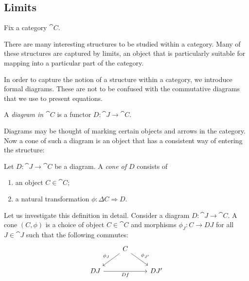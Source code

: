 \documentclass{article}
\begin{document}
\subsection{Limits}

Fix a category $\cat{C}$.

There are many interesting structures to be studied within a category. Many of these
structures are captured by limits, an object that is particularly suitable
for mapping into a particular part of the category.

In order to capture the notion of a structure within a category, we introduce
formal diagrams. These are not to be confused with the commutative diagrams that
we use to present equations.

\begin{definition}
  A \emph{diagram in $\cat{C}$} is a functor $D:\cat{J}\to\cat{C}$.
\end{definition}

Diagrams may be thought of marking certain objects and arrows in the category.
Now a cone of such a diagram is an object that has a consistent way of entering
the structure:

\begin{definition}
  Let $D:\cat{J}\to\cat{C}$ be a diagram. A \emph{cone of $D$} consists of
  \begin{enumerate}
    \item an object $C\in\cat{C}$;
    \item a natural transformation $\phi:\Delta C\Rightarrow D$.
  \end{enumerate}
\end{definition}

Let us investigate this definition in detail. Consider a diagram
$D:\cat{J}\to\cat{C}$. A cone $(C,\phi)$ is a choice of object $C\in\cat{C}$
and morphisms $\phi_J:C\to DJ$ for all $J\in\cat{J}$ such that the following
commutes:
\begin{equation}
  \begin{tikzcd}
  & C \\
    DJ && {DJ'}
    \arrow["Df"', from=2-1, to=2-3]
    \arrow["{\phi_{J'}}", from=1-2, to=2-3]
    \arrow["{\phi_J}"', from=1-2, to=2-1]
  \end{tikzcd}
\end{equation}
\end{document}
